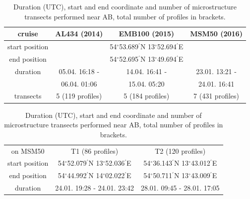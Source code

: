  \begin{table}
\caption{Duration (UTC), start and end coordinate and number of microstructure 
transects performed near AB, total number of profiles in 
brackets.}\label{mss}
\begin{center}
\begin{tabular}{cccc}
cruise & AL434 (2014) & EMB100 (2015) & MSM50 (2016)\\
\hline
start position & & 54$^\circ$53.689$^\prime$N 13$^\circ$52.694$^\prime$E & \\
end position & & 54$^\circ$52.695$^\prime$N 13$^\circ$49.694$^\prime$E& \\
\hline
duration & 05.04. 16:18 - & 14.04. 16:41 -  & 23.01. 
13:21 -  \\
&  06.04. 01:06 & 15.04. 05:20 & 24.01. 16:41 \\
\hline
transects & 5 (119 profiles) & 5 (184 profiles) & 7 (431 profiles)\\
\end{tabular}
\end{center}
\vskip 0.5cm
\begin{tabular}{ccc}
 on MSM50 & T1 (86 profiles) & T2 (120 profiles) \\
 start position & 54$^\circ$52.079$^\prime$N 13$^\circ$52.036$^\prime$E & 
54$^\circ$36.143$^\prime$N 13$^\circ$43.012$^\prime$E\\
 end position & 54$^\circ$44.992$^\prime$N 14$^\circ$02.022$^\prime$E & 
54$^\circ$50.711$^\prime$N 13$^\circ$43.009$^\prime$E\\
 duration & 24.01. 19:28 - 24.01. 23:42 & 28.01. 09:45 - 28.01. 17:05 \\
\end{tabular}


\end{table}

